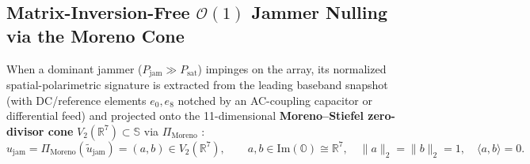\documentclass[11pt,a4paper]{article}
\theoremstyle{definition}
\theoremstyle{remark}
\newcommand{\R}{\mathbb{R}}
\newcommand{\Oc}{\mathbb{O}}
\newcommand{\Se}{\mathbb{S}}
\newcommand{\ImPart}{\mathrm{Im}}
\newcommand{\PiMoreno}{\Pi_{\mathrm{Moreno}}}
\begin{document}
\subsection{Matrix-Inversion-Free $\mathcal{O}(1)$ Jammer Nulling via the Moreno Cone}
When a dominant jammer ($P_{\mathrm{jam}} \gg P_{\mathrm{sat}}$) impinges on the array, its normalized spatial-polarimetric signature is extracted from the leading baseband snapshot (with DC/reference elements $e_0, e_8$ notched by an AC-coupling capacitor or differential feed) and projected onto the 11-dimensional \textbf{Moreno--Stiefel zero-divisor cone} $V_2(\R^7) \subset \Se$ via $\PiMoreno$ \cite{Moreno1998,Agourakis2026PG32}:
\begin{equation}
\label{eq:jammer_moreno}
u_{\mathrm{jam}} = \PiMoreno(\tilde{u}_{\mathrm{jam}}) = (a, b) \in V_2(\R^7), \qquad a, b \in \ImPart(\Oc) \cong \R^7, \quad \|a\|_2 = \|b\|_2 = 1, \quad \langle a, b \rangle = 0.
\end{equation}
\end{document}
